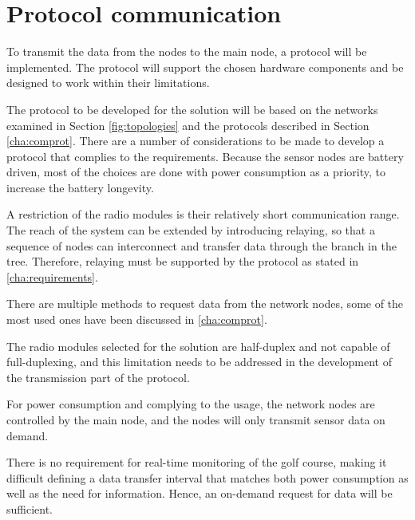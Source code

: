 \section{Protocol communication}\label{cha:protocolDesign}
To transmit the data from the nodes to the main node, a protocol will be implemented.
The protocol will support the chosen hardware components and be designed to work within their limitations. 

The protocol to be developed for the solution will be based on the networks examined in Section \ref{fig:topologies} and the protocols described in Section \ref{cha:comprot}.
There are a number of considerations to be made to develop a protocol that complies to the requirements.
Because the sensor nodes are battery driven, most of the choices are done with power consumption as a priority, to increase the battery longevity.

A restriction of the radio modules is their relatively short communication range. The reach of the system can be extended by introducing relaying, so that a sequence of nodes can interconnect and transfer data through the branch in the tree. Therefore, relaying must be supported by the protocol as stated in \ref{cha:requirements}. 

There are multiple methods to request data from the network nodes, some of the most used ones have been discussed in \ref{cha:comprot}.

The radio modules selected for the solution are half-duplex and not capable of full-duplexing, and this limitation needs to be addressed in the development of the transmission part of the protocol. 

For power consumption and complying to the usage, the network nodes are controlled by the main node, and the nodes will only transmit sensor data on demand.

There is no requirement for real-time monitoring of the golf course, making it difficult defining a data transfer interval that matches both power consumption as well as the need for information.
Hence, an on-demand request for data will be sufficient.

